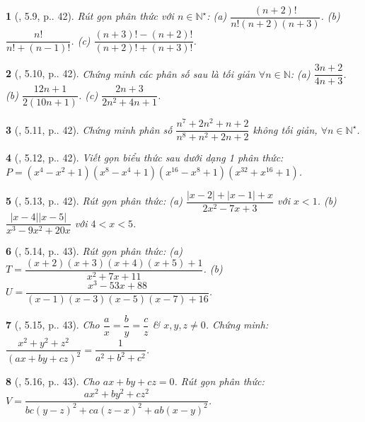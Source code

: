 \documentclass{article}
\newtheorem{baitoan}{}
\begin{document}
\begin{baitoan}[\cite{TLCT_THCS_Toan_8_dai_so}, 5.9, p.. 42]
	Rút gọn phân thức với $n\in\mathbb{N}^\star$: (a) $\dfrac{(n + 2)!}{n!(n + 2)(n + 3)}$. (b) $\dfrac{n!}{n! + (n - 1)!}$. (c) $\dfrac{(n + 3)! - (n + 2)!}{(n + 2)! + (n + 3)!}$.	
\end{baitoan}

\begin{baitoan}[\cite{TLCT_THCS_Toan_8_dai_so}, 5.10, p.. 42]
	Chứng minh các phân số sau là tối giản $\forall n\in\mathbb{N}$: (a) $\dfrac{3n + 2}{4n + 3}$. (b) $\dfrac{12n + 1}{2(10n + 1)}$. (c) $\dfrac{2n + 3}{2n^2 + 4n + 1}$.	
\end{baitoan}

\begin{baitoan}[\cite{TLCT_THCS_Toan_8_dai_so}, 5.11, p.. 42]
	Chứng minh phân số $\dfrac{n^7 + 2n^2 + n + 2}{n^8 + n^2 + 2n + 2}$ không tối giản, $\forall n\in\mathbb{N}^\star$.
\end{baitoan}

\begin{baitoan}[\cite{TLCT_THCS_Toan_8_dai_so}, 5.12, p.. 42]
	Viết gọn biểu thức sau dưới dạng 1 phân thức: $P = (x^4 - x^2 + 1)(x^8 - x^4 + 1)(x^{16} - x^8 + 1)(x^{32} + x^{16} + 1)$.
\end{baitoan}

\begin{baitoan}[\cite{TLCT_THCS_Toan_8_dai_so}, 5.13, p.. 42]
	Rút gọn phân thức: (a) $\dfrac{|x - 2| + |x - 1| + x}{2x^2 - 7x + 3}$ với $x < 1$. (b) $\dfrac{|x - 4||x - 5|}{x^3 - 9x^2 + 20x}$ với $4 < x < 5$.	
\end{baitoan}

\begin{baitoan}[\cite{TLCT_THCS_Toan_8_dai_so}, 5.14, p.. 43]
	Rút gọn phân thức: (a) $T = \dfrac{(x + 2)(x + 3)(x + 4)(x + 5) + 1}{x^2 + 7x + 11}$. (b) $U = \dfrac{x^3 - 53x + 88}{(x - 1)(x - 3)(x - 5)(x - 7) + 16}$.	
\end{baitoan}

\begin{baitoan}[\cite{TLCT_THCS_Toan_8_dai_so}, 5.15, p.. 43]
	Cho $\dfrac{a}{x} = \dfrac{b}{y} = \dfrac{c}{z}$ \& $x,y,z\ne 0$. Chứng minh: $\dfrac{x^2 + y^2 + z^2}{(ax + by + cz)^2} = \dfrac{1}{a^2 + b^2 + c^2}$.
\end{baitoan}

\begin{baitoan}[\cite{TLCT_THCS_Toan_8_dai_so}, 5.16, p.. 43]
	Cho $ax + by + cz = 0$. Rút gọn phân thức: $V = \dfrac{ax^2 + by^2 + cz^2}{bc(y - z)^2 + ca(z - x)^2 + ab(x - y)^2}$.
\end{baitoan}
\end{document}
